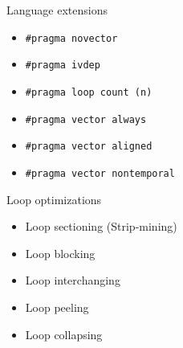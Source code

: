 \begin{frame}{Language extensions}
\begin{itemize}
\item \texttt{\#pragma novector} 
\item \texttt{\#pragma ivdep}
\item \texttt{\#pragma loop count (n)}
\item \texttt{\#pragma vector always}
\item \texttt{\#pragma vector aligned}
\item \texttt{\#pragma vector nontemporal}
\end{itemize}
\end{frame}

\begin{frame}{Loop optimizations}
\begin{itemize}
\item Loop sectioning (Strip-mining)
\item Loop blocking
\item Loop interchanging
\item Loop peeling
\item Loop collapsing
\end{itemize}
\end{frame}



